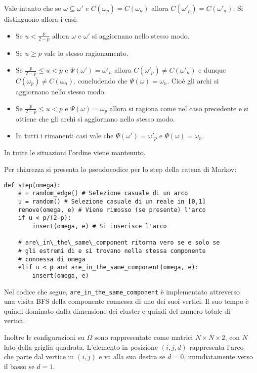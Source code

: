 \documentclass[]{marticle}
\begin{document}
Vale intanto che se $\omega\subseteq\omega'$ e $C(\omega_p)=C(\omega_n)$ allora
$C(\omega'_p) = C(\omega'_n)$. Si distinguono allora i casi:
\begin{itemize}
    \item Se $u<\frac{p}{2-p}$ allora $\omega$ e $\omega'$ si aggiornano nello
        stesso modo.
    \item Se $u\geq p$ vale lo stesso ragionamento.
    \item Se $\frac{p}{2-p} \leq u < p$ e $\Psi(\omega') = \omega'_n$ allora
        $C(\omega'_p)\neq C(\omega'_n)$ e dunque $C(\omega_p)\neq C(\omega_n)$,
        concludendo che $\Psi(\omega) = \omega_n$. Cio\`e gli archi si
        aggiornano nello stesso modo.
    \item Se $\frac{p}{2-p} \leq u < p$ e $\Psi(\omega) = \omega_p$ allora si
        ragiona come nel caso precedente e si ottiene che gli archi si
        aggiornano nello stesso modo.
    \item In tutti i rimanenti casi vale che $\Psi(\omega')=\omega'_p$ e
        $\Psi(\omega)=\omega_n$.
\end{itemize}
In tutte le situazioni l'ordine viene mantenuto.

Per chiarezza si presenta lo pseudocodice per lo step della catena di Markov:
\begin{lstlisting}
def step(omega):
    e = random_edge() # Selezione casuale di un arco
    u = random() # Selezione casuale di un reale in [0,1]
    remove(omega, e) # Viene rimosso (se presente) l'arco
    if u < p/(2-p):
        insert(omega, e) # Si inserisce l'arco

    # are\_in\_the\_same\_component ritorna vero se e solo se 
    # gli estremi di e si trovano nella stessa componente
    # connessa di omega
    elif u < p and are_in_the_same_component(omega, e):
        insert(omega, e)
\end{lstlisting}

Nel codice che segue, \texttt{are\_in\_the\_same\_component} \`e implementato
attreverso una visita BFS della componente connessa di uno dei suoi vertici. Il
suo tempo \`e quindi dominato dalla dimensione dei cluster e quindi del numero
totale di vertici. 

Inoltre le configurazioni su $\Omega$ sono rappresentate come matrici $N\times N
\times 2$, con $N$ lato della griglia quadrata. L'elemento in posizione
$(i,j,d)$ rappresenta l'arco che parte dal vertice in $(i,j)$ e va alla sua
destra se $d=0$, immdiatamente verso il basso se $d=1$.
\end{document}
